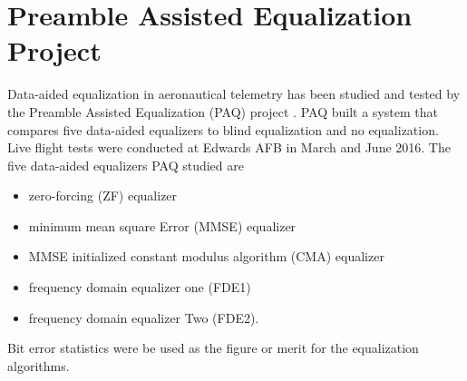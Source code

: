 

\chapter{Preamble Assisted Equalization Project}
\label{chap:PAQ_project}
Data-aided equalization in aeronautical telemetry has been studied and tested by the Preamble Assisted Equalization (PAQ) project \cite{paq-phase1-report:2014}.
PAQ built a system that compares five data-aided equalizers to blind equalization and no equalization.
Live flight tests were conducted at Edwards AFB in March and June 2016.
The five data-aided equalizers PAQ studied are
\begin{itemize}
\item zero-forcing (ZF) equalizer
\item minimum mean square Error (MMSE) equalizer
\item MMSE initialized constant modulus algorithm (CMA) equalizer
\item frequency domain equalizer one (FDE1)
\item frequency domain equalizer Two (FDE2).
\end{itemize}
Bit error statistics were be used as the figure or merit for the equalization algorithms.
